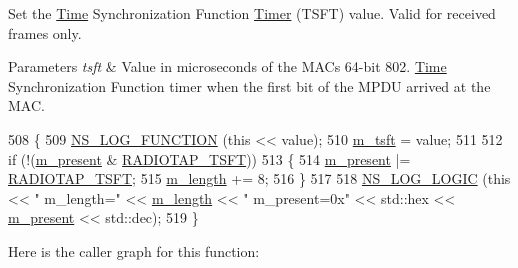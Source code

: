 Set the \hyperlink{classns3_1_1Time}{Time} Synchronization Function \hyperlink{classns3_1_1Timer}{Timer} (T\+S\+FT) value. Valid for received frames only. 


\begin{DoxyParams}{Parameters}
{\em tsft} & Value in microseconds of the M\+AC\textquotesingle{}s 64-\/bit 802. \hyperlink{classns3_1_1Time}{Time} Synchronization Function timer when the first bit of the M\+P\+DU arrived at the M\+AC. \\
\hline
\end{DoxyParams}

\begin{DoxyCode}
508 \{
509   \hyperlink{log-macros-disabled_8h_a90b90d5bad1f39cb1b64923ea94c0761}{NS\_LOG\_FUNCTION} (\textcolor{keyword}{this} << value);
510   \hyperlink{classns3_1_1RadiotapHeader_afbf83bcbbcfeb4c41f1837ef32e301fa}{m\_tsft} = value;
511 
512   \textcolor{keywordflow}{if} (!(\hyperlink{classns3_1_1RadiotapHeader_a8b8aca212245ad4ad1aa796d4cc802bb}{m\_present} & \hyperlink{classns3_1_1RadiotapHeader_afd15dfe66387dfbcbf62865d024f58ffa5d2d063cf0cde637163d08de441ffa80}{RADIOTAP\_TSFT}))
513     \{
514       \hyperlink{classns3_1_1RadiotapHeader_a8b8aca212245ad4ad1aa796d4cc802bb}{m\_present} |= \hyperlink{classns3_1_1RadiotapHeader_afd15dfe66387dfbcbf62865d024f58ffa5d2d063cf0cde637163d08de441ffa80}{RADIOTAP\_TSFT};
515       \hyperlink{classns3_1_1RadiotapHeader_a6894ef017e95e58463eac5e435507a33}{m\_length} += 8;
516     \}
517 
518   \hyperlink{group__logging_ga88acd260151caf2db9c0fc84997f45ce}{NS\_LOG\_LOGIC} (\textcolor{keyword}{this} << \textcolor{stringliteral}{" m\_length="} << \hyperlink{classns3_1_1RadiotapHeader_a6894ef017e95e58463eac5e435507a33}{m\_length} << \textcolor{stringliteral}{" m\_present=0x"} << std::hex << 
      \hyperlink{classns3_1_1RadiotapHeader_a8b8aca212245ad4ad1aa796d4cc802bb}{m\_present} << std::dec);
519 \}
\end{DoxyCode}


Here is the caller graph for this function\+:


